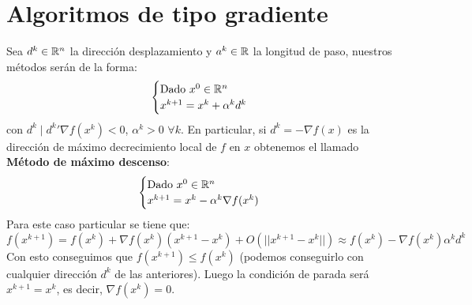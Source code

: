 \documentclass[MIOP.tex]{subfiles}
\begin{document}
\section{Algoritmos de tipo gradiente}
Sea $d^k \in\mathbb{R}^n$ la dirección desplazamiento y $a^k \in \mathbb{R}$ la longitud de paso, nuestros métodos serán de la forma:
\[
\begin{cases}
\text{Dado $x^0\in \mathbb{R}^n$}\\
x^{k+1} = x^k + \alpha^k d^k
\end{cases}
\]
con $d^k\mid {d^k}'\nabla f(x^k)<0$, $\alpha^k>0$ $\forall k$. En particular, si $d^k = -\nabla f(x)$ es la dirección de máximo decrecimiento local de $f$ en $x$ obtenemos el llamado \textbf{Método de máximo descenso}:
\[
\begin{cases}
\text{Dado $x^0\in \mathbb{R}^n$}\\
x^{k+1} = x^k - \alpha^k \nabla f(x^k)
\end{cases}
\]
Para este caso particular se tiene que:
\[
f(x^{k+1})=f(x^k)+\nabla f(x^k)(x^{k+1}-x^k) + O(||x^{k+1}-x^k||) \approx f(x^k)-\nabla f(x^k)\alpha^k d^k
\]
Con esto conseguimos que $f(x^{k+1})\leq f(x^k)$ (podemos conseguirlo con cualquier dirección $d^k$ de las anteriores). Luego la condición de parada será $x^{k+1}=x^k$, es decir, $\nabla f(x^k)=0$. 
\end{document}
